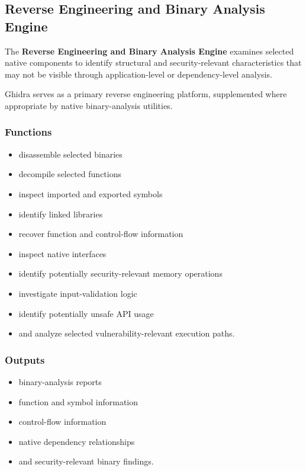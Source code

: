 \documentclass[
  12pt,
  letterpaper,
  oneside]{report}
\providecommand{\tightlist}{%
  \setlength{\itemsep}{0pt}\setlength{\parskip}{0pt}}
\begin{document}
\subsection{Reverse Engineering and Binary Analysis Engine}\label{1034-reverse-engineering-and-binary-analysis-engine}

The \textbf{Reverse Engineering and Binary Analysis Engine} examines
selected native components to identify structural and security-relevant
characteristics that may not be visible through application-level or
dependency-level analysis.

Ghidra serves as a primary reverse engineering platform, supplemented
where appropriate by native binary-analysis utilities.

\subsubsection{Functions}\label{functions-3}

\begin{itemize}
\tightlist
\item
  disassemble selected binaries
\item
  decompile selected functions
\item
  inspect imported and exported symbols
\item
  identify linked libraries
\item
  recover function and control-flow information
\item
  inspect native interfaces
\item
  identify potentially security-relevant memory operations
\item
  investigate input-validation logic
\item
  identify potentially unsafe API usage
\item
  and analyze selected vulnerability-relevant execution paths.
\end{itemize}

\subsubsection{Outputs}\label{outputs-3}

\begin{itemize}
\tightlist
\item
  binary-analysis reports
\item
  function and symbol information
\item
  control-flow information
\item
  native dependency relationships
\item
  and security-relevant binary findings.
\end{itemize}
\end{document}
